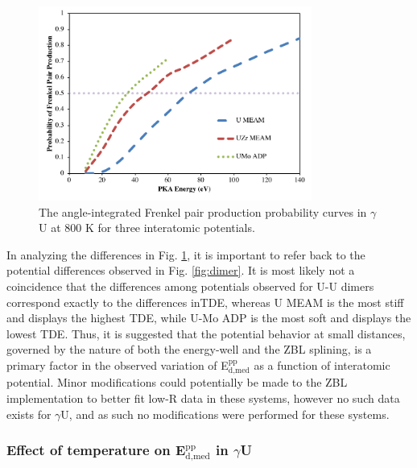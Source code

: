 \documentclass[review]{elsarticle}
\begin{document}
\begin{figure}[h]
 \centering
 \includegraphics[width=0.8\textwidth]{gam800A.png} 
 \caption{The angle-integrated Frenkel pair production probability curves in $\gamma$U at 800 K for three interatomic potentials.}
 \label{fig:gam800}
\end{figure}

In analyzing the differences in Fig. \ref{fig:gam800}, it is important to refer back to the potential differences observed in Fig. \ref{fig:dimer}. It is most likely not a coincidence that the differences among potentials observed for U-U dimers correspond exactly to the differences inTDE, whereas U MEAM is the most stiff and displays the highest TDE, while U-Mo ADP is the most soft and displays the lowest TDE. Thus, it is suggested that the potential behavior at small distances, governed by the nature of both the energy-well and the ZBL splining, is a primary factor in the observed variation of E$^{\textrm{pp}}_{\textrm{d,med}}$ as a function of interatomic potential. Minor modifications could potentially be made to the ZBL implementation to better fit low-R data in these systems, however no such data exists for $\gamma$U, and as such no modifications were performed for these systems.

\FloatBarrier

\subsubsection{Effect of temperature on E$^{\textrm{pp}}_{\textrm{d,med}}$ in $\gamma$U}
\end{document}
